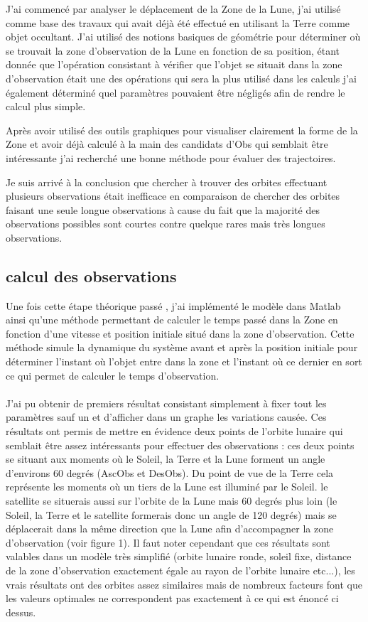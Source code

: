 \documentclass[12pt]{article} %
\begin{document}
		J'ai commencé par analyser le déplacement de la \gls{Zone} de la Lune, j'ai utilisé comme base des travaux qui avait déjà été effectué en utilisant la Terre comme objet occultant. J'ai utilisé des notions basiques de géométrie pour déterminer où se trouvait la zone d'observation de la Lune en fonction de sa position, étant donnée que l'opération consistant à vérifier que l'objet se situait dans la zone d'observation était une des opérations qui sera la plus utilisé dans les calculs j'ai également déterminé quel paramètres pouvaient être négligés afin de rendre le calcul plus simple.
		
		Après avoir utilisé des outils graphiques pour visualiser clairement la forme de la \gls{Zone} et avoir déjà calculé à la main des candidats d'\gls{Obs} qui semblait être intéressante j'ai recherché une bonne méthode pour évaluer des trajectoires.
		
		Je suis arrivé à la conclusion que chercher à trouver des orbites effectuant plusieurs observations était inefficace en comparaison de chercher des orbites faisant une seule longue observations à cause du fait que la majorité des observations possibles sont courtes contre quelque rares mais très longues observations.
		
		\subsection{calcul des observations}
		Une fois cette étape théorique passé , j'ai implémenté le modèle dans Matlab ainsi qu'une méthode permettant de calculer le temps passé dans la \gls{Zone} en fonction d'une vitesse et position initiale situé dans la zone d'observation. Cette méthode simule la dynamique du système avant et après la position initiale pour déterminer l'instant où l'objet entre dans la zone et l'instant où ce dernier en sort ce qui permet de calculer le temps d'observation.
		\\ \\
		J'ai pu obtenir de premiers résultat consistant simplement à fixer tout les paramètres sauf un et d'afficher dans un graphe les variations causée. Ces résultats ont permis de mettre en évidence deux points de l'orbite lunaire qui semblait être assez intéressants pour effectuer des observations : ces deux points se situant aux moments où le Soleil, la Terre et la Lune forment un angle d'environs 60 degrés (\gls{AscObs} et \gls{DesObs}). Du point de vue de la Terre cela représente les moments où un tiers de la Lune est illuminé par le Soleil. le satellite se situerais aussi sur l'orbite de la Lune mais 60 degrés plus loin (le Soleil, la Terre et le satellite formerais donc un angle de 120 degrés) mais se déplacerait dans la même direction que la Lune afin d'accompagner la zone d'observation (voir figure 1). Il faut noter cependant que ces résultats sont valables dans un modèle très simplifié (orbite lunaire ronde, soleil fixe, distance de la zone d'observation exactement égale au rayon de l'orbite lunaire etc...), les vrais résultats ont des orbites assez similaires mais de nombreux facteurs font que les valeurs optimales ne correspondent pas exactement à ce qui est énoncé ci dessus.
		
\end{document}
